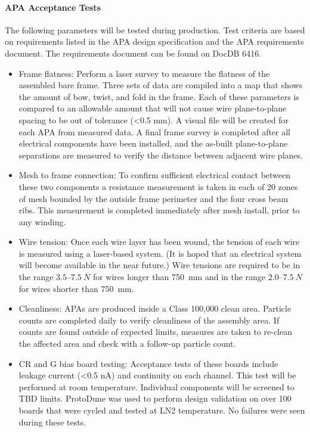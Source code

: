 \paragraph{APA Acceptance Tests} The following parameters will be tested during production. Test criteria are based on requirements listed in the APA design specification and the APA requirements document. The requirements document can be found on DocDB 6416. 

\begin{itemize}
\item Frame flatness: Perform a laser survey to measure the flatness of the assembled bare frame. Three sets of data are compiled into a map that shows the amount of bow, twist, and fold in the frame. Each of these parameters is compared to an allowable amount that will not cause wire plane-to-plane spacing to be out of tolerance (<0.5 mm).  A visual file will be created for each APA from measured data.
A final frame survey is completed after all electrical components have been installed, and the as-built plane-to-plane separations are measured to verify the distance between adjacent wire planes.

\item Mesh to frame connection: To confirm sufficient electrical contact between these two components a resistance measurement is taken in each of 20 zones of mesh bounded by the outside frame perimeter and the four cross beam ribs. 
This measurement is completed immediately after mesh install, prior to any winding.

\item Wire tension: Once each wire layer has been wound, the tension of each wire is measured using a laser-based system. (It is hoped that an electrical system will become available in the near future.) Wire tensions are required to be in the range $3.5\textrm{--}\SI{7.5}{N}$ for wires longer than \SI{750}{mm} and in the range $2.0\textrm{--}\SI{7.5}{N}$ for wires shorter than \SI{750}{mm}.


\item Cleanliness: APAs are produced inside a Class 100,000 clean area.  Particle counts are completed daily to verify cleanliness of the assembly area.  If counts are found outside of expected limits, measures are taken to re-clean the affected area and check with a follow-up particle count.

\item CR and G bias board testing: Acceptance tests of these boards include leakage current (<0.5 nA) and continuity on each channel.  This test will be performed at room temperature. Individual components will be screened to TBD limits. ProtoDune was used to perform design validation on over 100 boards that were cycled and tested at LN2 temperature. No failures were seen during these tests. 
\end{itemize}

